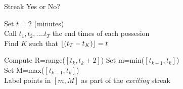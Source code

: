 \documentclass[12 pt,a4paper]{article}
\DeclarePairedDelimiter\floor{\lfloor}{\rfloor}
\theoremstyle{plain}
\theoremstyle{definition}
\theoremstyle{remark}
\begin{document}
\begin{algorithm}
\caption{Streak Yes or No?}
\begin{algorithmic} 
\vspace{0.6cm}
\STATE Set $t=2$ (minutes) \\
Call $t_1,t_2,....t_T$ the end times of each possesion \\
Find $K$ such that $\floor*{(t_T-t_K)}=t$
\vspace{0.6cm}

\vspace{0.15cm}
\STATE Compute R=range($[t_{k},t_{k}+2]$)
\vspace{0.3cm}
\STATE Set m=min($[t_{k-1},t_k] $) \\
Set M=max($[t_{k-1},t_k]$) \\
Label points in $[m,M]$ as part of the \textit{exciting} streak
\ENDIF
\vspace{0.3cm}
\ENDFOR

\vspace{0.6cm}
\end{algorithmic}
\end{algorithm}
\end{document}
